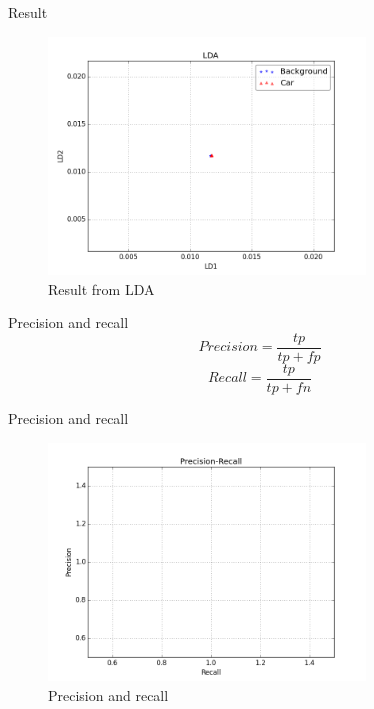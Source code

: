 \documentclass[handout]{beamer}
\begin{document}
\begin{frame}{Result}
    {\centering
    \begin{figure}[H]
        \includegraphics[width=0.75\textwidth]{project_03/lda.png}
        \caption{Result from LDA}
    \end{figure}
    }
\end{frame}

\begin{frame}{Precision and recall}
\Huge
\begin{equation}
    Precision = \frac{tp}{tp + fp}
\end{equation}
\begin{equation}
    Recall = \frac{tp}{tp + fn}
\end{equation}
\end{frame}

\begin{frame}{Precision and recall}
    {\centering
    \begin{figure}[H]
        \includegraphics[width=0.75\textwidth]{project_03/precision_recall.png}
        \caption{Precision and recall}
    \end{figure}
    }
\end{frame}
\end{document}
